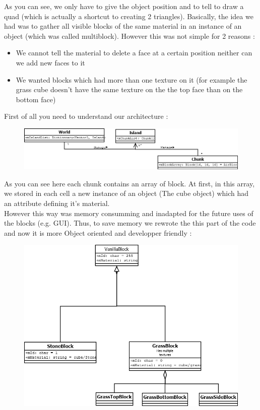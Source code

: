 \documentclass[article]{report}             %
\begin{document}
As you can see, we only have to give the object position and to tell to draw a quad (which is actually a shortcut to creating 2 triangles).
Basically, the idea we had was to gather all visible blocks of the same material in an instance of an object (which was called multiblock). However this was not simple for 2 reasons :
\begin{itemize}
\item We cannot tell the material to delete a face at a certain position neither can we add new faces to it
\item We wanted blocks which had more than one texture on it (for example the grass cube doesn't have the same texture on the the top face than on the bottom
 face)
 \end {itemize}

First of all you need to understand our architecture : 
				\begin{figure}[h]
					\includegraphics[scale=0.5]{images/Hierarchy.png}
				\end{figure}

As you can see here each chunk contains an array of block. At first, in this array, we stored in each cell a new instance of an object (The cube object) which had an attribute defining it's material.\\

However this way was memory consumming and inadapted for the future uses of the blocks (e.g. GUI). Thus, to save memory we rewrote the this part of the code and now it is more Object oriented and developper friendly : 

				\begin{figure}[h]
				\includegraphics[scale=0.5]{images/cubes.png}
				\end{figure}
\end{document}
